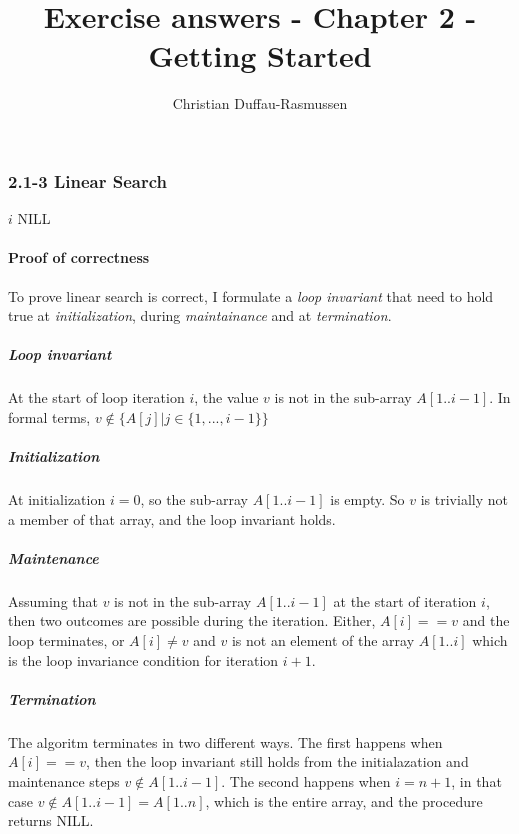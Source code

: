 \documentclass{article}
\title{Exercise answers - Chapter 2 - Getting Started}
\author{Christian Duffau-Rasmussen}
\let\oldReturn\Return
\renewcommand{\Return}{\State\oldReturn}
\begin{document}
\subsubsection*{2.1-3 Linear Search}

\begin{algorithmic}[1]
\Return $i$
\EndIf
\EndFor
\Return NILL
\EndProcedure
\end{algorithmic}

\paragraph{Proof of correctness}

To prove linear search is correct, I formulate a \emph{loop invariant} that need to hold true at \emph{initialization}, during \emph{maintainance} and at \emph{termination}.

\subparagraph{Loop invariant} At the start of loop iteration $i$, the value $v$ is not in the sub-array $A[1..i-1]$. In formal terms, $v \notin \{ A[j] \vert j\in\{1,...,i-1\} \}$

\subparagraph{Initialization} At initialization $i=0$, so the sub-array $A[1..i-1]$ is empty. So $v$ is trivially not a member of that array, and the loop invariant holds.

\subparagraph{Maintenance} Assuming that $v$ is not in the sub-array $A[1..i-1]$ at the start of iteration $i$, then two outcomes are possible during the iteration. Either, $A[i] == v$ and the loop terminates, or $A[i]\neq v$ and $v$ is not an element of the array $A[1..i]$ which is the loop invariance condition for iteration $i+1$.

\subparagraph{Termination} The algoritm terminates in two different ways. The first happens when $A[i] == v$, then the loop invariant still holds from the initialazation and maintenance steps $v \notin A[1..i-1]$. The second happens when $i=n+1$, in that case $v \notin A[1..i-1]=A[1..n]$, which is the entire array, and the procedure returns NILL.
\end{document}
